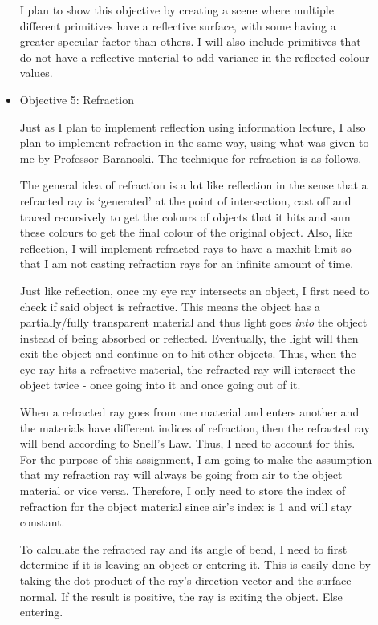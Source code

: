\documentclass {article}
\begin{document}
\begin{description}
\begin{itemize}
	I plan to show this objective by creating a scene where multiple different primitives have a reflective surface, with some having a greater specular factor than others. I will also include primitives that do not have a reflective material to add variance in the reflected colour values. \newline
    	
    	\item Objective 5: Refraction \newline
    	
Just as I plan to implement reflection using information lecture, I also plan to implement refraction in the same way, using what was given to me by Professor Baranoski. The technique for refraction is as follows. \newline
	
	The general idea of refraction is a lot like reflection in the sense that a refracted ray is `generated' at the point of intersection, cast off and traced recursively to get the colours of objects that it hits and sum these colours to get the final colour of the original object. Also, like reflection, I will implement refracted rays to have a maxhit limit so that I am not casting refraction rays for an infinite amount of time.
	
	Just like reflection, once my eye ray intersects an object, I first need to check if said object is refractive. This means the object has a partially/fully transparent material and thus light goes {\it into} the object instead of being absorbed or reflected. Eventually, the light will then exit the object and continue on to hit other objects. Thus, when the eye ray hits a refractive material, the refracted ray will intersect the object twice - once going into it and once going out of it. \newline
	
	When a refracted ray goes from one material and enters another and the materials have different indices of refraction, then the refracted ray will bend according to Snell's Law. Thus, I need to account for this. For the purpose of this assignment, I am going to make the assumption that my refraction ray will always be going from air to the object material or vice versa. Therefore, I only need to store the index of refraction for the object material since air's index is 1 and will stay constant. \newline
	
	To calculate the refracted ray and its angle of bend, I need to first determine if it is leaving an object or entering it. This is easily done by taking the dot product of the ray's direction vector and the surface normal. If the result is positive, the ray is exiting the object. Else entering. \newline
	

\end{itemize}
\end{description}
\end{document}
